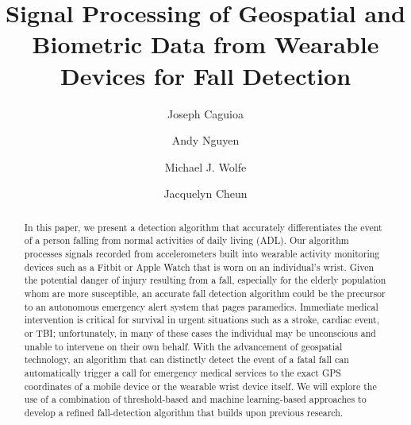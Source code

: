 \documentclass{llncs}
\title{\textbf{Signal Processing of Geospatial and Biometric Data from Wearable Devices for Fall Detection}}
\author{Joseph Caguioa\inst{1}\and Andy Nguyen\inst{1}\and  Michael J. Wolfe\inst{1}\and Jacquelyn Cheun\inst{1}} %
\institute{Master of Science in Data Science, Southern Methodist University, Dallas TX 75275 USA
	      \email{\{jcaguioa, andynguyen, mwolfe, \& jcheun\}@smu.edu} 
	      }
\begin{document}
\maketitle

\begin{abstract}
In this paper, we present a detection algorithm that accurately differentiates the event of a person falling from normal activities of daily living (ADL). Our algorithm processes signals recorded from accelerometers built into wearable activity monitoring devices such as a Fitbit or Apple Watch that is worn on an individual's wrist. Given the potential danger of injury resulting from a fall, especially for the elderly population whom are more susceptible, an accurate fall detection algorithm could be the precursor to an autonomous emergency alert system that pages paramedics. Immediate medical intervention is critical for survival in urgent situations such as a stroke, cardiac event, or TBI; unfortunately, in many of these cases the individual may be unconscious and unable to intervene on their own behalf. With the advancement of geospatial technology, an algorithm that can distinctly detect the event of a fatal fall can automatically trigger a call for emergency medical services to the exact GPS coordinates of a mobile device or the wearable wrist device itself. We will explore the use of a combination of threshold-based and machine learning-based approaches to develop a refined fall-detection algorithm that builds upon previous research. 
\end{abstract}





\end{document}
